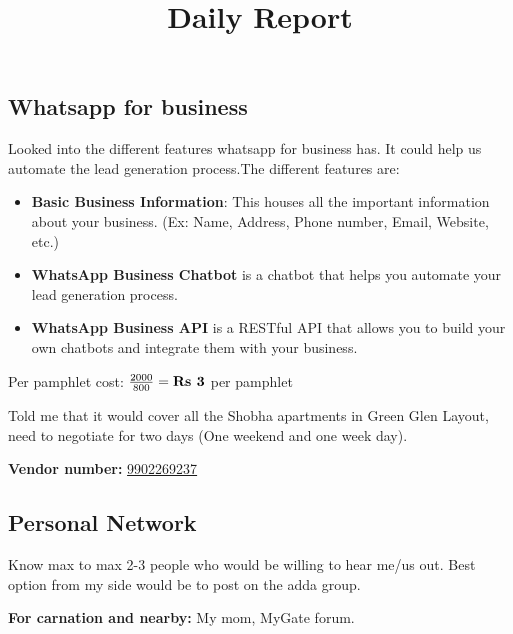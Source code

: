 \documentclass[12pt, a4paper]{article}
\begin{document}
\title{Daily Report}
\maketitle

\subsection{Whatsapp for business}

Looked into the different features whatsapp for business has. It could help us automate the lead generation process.The different features are:

\begin{itemize}
    \item \textbf{Basic Business Information}: This houses all the important information about your business. (Ex: Name, Address, Phone number, Email, Website, etc.)
    \item \textbf{WhatsApp Business Chatbot} is a chatbot that helps you automate your lead generation process.
    \item \textbf{WhatsApp Business API} is a RESTful API that allows you to build your own chatbots and integrate them with your business.
\end{itemize}


\vspace{0.5cm}

Per pamphlet cost: $\frac{2000}{800} = \textbf{Rs \the\numexpr 2000 / 800 \relax} $ per pamphlet

\bigskip

\noindent Told me that it would cover all the Shobha apartments in Green Glen Layout, need to negotiate for two days (One weekend and one week day).

\bigskip

\textbf{Vendor number:} \href{tel:+919902269237}{9902269237}

\subsection{Personal Network}

Know max to max 2-3 people who would be willing to hear me/us out. Best option from my side would be to post on the adda group.

\vspace{0.25cm}

\noindent \textbf{For carnation and nearby:} My mom, MyGate forum.

\vspace{0.25cm}
\end{document}

